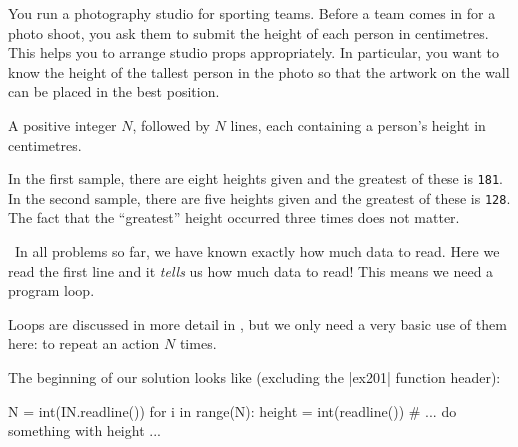 
\clearpage


\Question You run a photography studio for sporting teams. Before a team comes in for a
photo shoot, you ask them to submit the height of each person in centimetres. This helps
you to arrange studio props appropriately. In particular, you want to know the height of
the tallest person in the photo so that the artwork on the wall can be placed in the best
position.

\Input A positive integer $N$, followed by $N$ lines, each containing a person's height in
centimetres.

\Sample

             {}

\Explanation In the first sample, there are eight heights given and the greatest of these
is \texttt{181}. In the second sample, there are five heights given and the greatest of
these is \texttt{128}. The fact that the ``greatest'' height occurred three times does not
matter.

\Scratch\ In all problems so far, we have known exactly how much data to read. Here we
read the first line and it \emph{tells} us how much data to read! This means we need a
program loop.

Loops are discussed in more detail in , but we only need a very
basic use of them here: to repeat an action $N$ times.

The beginning of our solution looks like (excluding the \pycode|ex201| function header):
\begin{pythoncode}
  N = int(IN.readline())
  for i in range(N):
    height = int(readline())
    # ... do something with height ...
\end{pythoncode}

